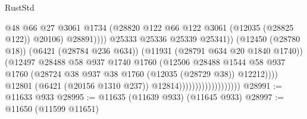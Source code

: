 \begin{lexlean}{RustStd}
\begin{coremodule}
                                                        @48
                                                        @66
                                                        @27
                                                        @3061
                                                        @1734
                                                        (@28820
                                                          @122
                                                          @66
                                                          @122
                                                          @3061
                                                          (@12035 (@28825 @122))
                                                          @20106)
                                                        @28891))))
                                                @25333
                                                @25336
                                                @25339
                                                @25341))
                                            (@12450 (@28780 @18))
                                            (@6421 (@28784 @236 @634))
                                            (@11931 (@28791 @634 @20 @1840 @1740))
                                            (@12497
                                              @28488
                                              @58
                                              @937
                                              @1740
                                              @1760
                                              (@12506
                                                @28488
                                                @1544
                                                @58
                                                @937
                                                @1760
                                                (@28724
                                                  @38
                                                  @937
                                                  @38
                                                  @1760
                                                  (@12035 (@28729 @38))
                                                  @12212))))
                                          @12801
                                          (@6421 (@20156 @1310 @237))
                                          @12814)))))))))))))))))))
@28991 := @11633 @933
@28995 := @11635 (@11639 @933) (@11645 @933)
@28997 := @11650 (@11599 @11651)

\end{coremodule}
\end{lexlean}
